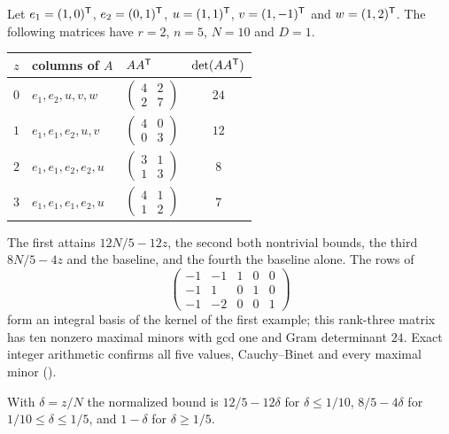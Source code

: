 \begin{example}\label{src:ex:gram}
Let $e_1=(1,0)^{\mathsf{T}}$, $e_2=(0,1)^{\mathsf{T}}$, $u=(1,1)^{\mathsf{T}}$, $v=(1,-1)^{\mathsf{T}}$
and $w=(1,2)^{\mathsf{T}}$. The following matrices have $r=2$, $n=5$, $N=10$ and $D=1$.
\begin{center}\small
\begin{tabular}{cllc}
\toprule
$z$ & columns of $A$ & $AA^{\mathsf{T}}$ & $\det(AA^{\mathsf{T}})$\\
\midrule
$0$ & $e_1,e_2,u,v,w$ & $\left(\begin{smallmatrix}4&2\\2&7\end{smallmatrix}\right)$ & $24$\\
$1$ & $e_1,e_1,e_2,u,v$ & $\left(\begin{smallmatrix}4&0\\0&3\end{smallmatrix}\right)$ & $12$\\
$2$ & $e_1,e_1,e_2,e_2,u$ & $\left(\begin{smallmatrix}3&1\\1&3\end{smallmatrix}\right)$ & $8$\\
$3$ & $e_1,e_1,e_1,e_2,u$ & $\left(\begin{smallmatrix}4&1\\1&2\end{smallmatrix}\right)$ & $7$\\
\bottomrule
\end{tabular}
\end{center}
The first attains $12N/5-12z$, the second both nontrivial bounds, the third $8N/5-4z$ and the
baseline, and the fourth the baseline alone. The rows of
\[
 \begin{pmatrix}-1&-1&1&0&0\\-1&1&0&1&0\\-1&-2&0&0&1\end{pmatrix}
\]
form an integral basis of the kernel of the first example; this rank-three matrix has ten
nonzero maximal minors with gcd one and Gram determinant $24$. Exact integer arithmetic confirms
all five values, Cauchy--Binet and every maximal minor
().
\end{example}

With $\delta=z/N$ the normalized bound is $12/5-12\delta$ for $\delta\le1/10$,
$8/5-4\delta$ for $1/10\le\delta\le1/5$, and $1-\delta$ for $\delta\ge1/5$.

